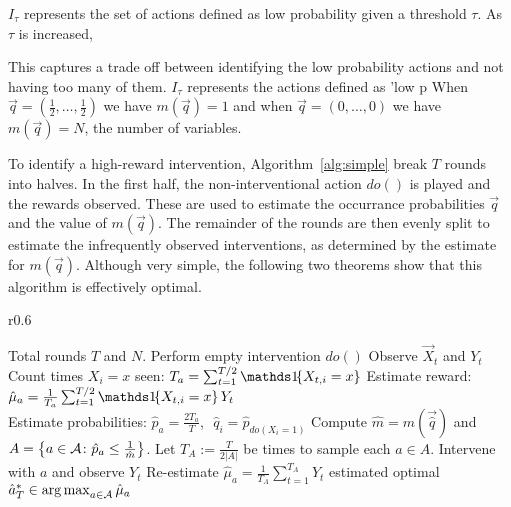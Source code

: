 $I_\tau$ represents the set of actions defined as low probability given a threshold $\tau$. As $\tau$ is increased, 

This captures a trade off between identifying the low probability actions and not having too many of them. $I_\tau$ represents the actions defined as 'low p
When $\vec{q} = (\frac{1}{2}, \ldots, \frac{1}{2})$ we have $m(\vec{q}) = 1$ and when $\vec{q} = (0, \ldots, 0)$ we have $m(\vec{q}) = N$, the number of variables.

To identify a high-reward intervention, Algorithm~\ref{alg:simple} break $T$ rounds into halves. 
In the first half, the non-interventional action $do()$ is played and the rewards observed.
These are used to estimate the occurrance probabilities $\vec{q}$ and the value of $m(\vec{q})$.
The remainder of the rounds are then evenly split to estimate the infrequently observed interventions, as determined by the estimate for $m(\vec{q})$.
Although very simple, the following two theorems show that this algorithm is effectively optimal.

\begin{wrapfigure}[22]{r}{0.6\textwidth}
\vspace{-10pt}
\begin{minipage}{.6\textwidth}
\begin{algorithm}[H]
\caption{Parallel Bandit Algorithm}\label{alg:simple}
\begin{algorithmic}[1]
 Total rounds $T$ and $N$.
\STATE Perform empty intervention $do()$
\STATE Observe $\vec{X}_t$ and $Y_t$
\ENDFOR
{}
\STATE Count times $X_i = x$ seen: $T_a = \sum_{t=1}^{T/2} \ind{X_{t,i} = x}$
\STATE Estimate reward: $\hat{\mu}_a = \frac{1}{T_a} \sum_{t=1}^{T/2} \ind{X_{t,i} = x} Y_t$ \\[0.2cm]
\STATE Estimate probabilities: $\hat{p}_a = \frac{2 T_a}{T}$,\,\, $\hat q_i = \hat p_{do(X_i = 1)}$
\ENDFOR
\STATE Compute $\hat{m} = m(\vec{\hat q})$ and $A = \left\{a \in \mathcal{A} \colon \hat{p}_a \leq \frac{1}{\hat m}\right\}$.
\STATE Let $T_A := \frac{T}{2 |A|}$ be times to sample each $a\in A$.
\STATE Intervene with $a$ and observe $Y_t$
\ENDFOR
\STATE Re-estimate $\hat{\mu}_a = \frac{1}{T_A} \sum_{t=1}^{T_A} Y_t$
\ENDFOR
\RETURN estimated optimal $\hat{a}^*_T \in \argmax_{a\in\actions} \hat{\mu}_a$
\end{algorithmic}
\end{algorithm}
\end{minipage}
\end{wrapfigure}

